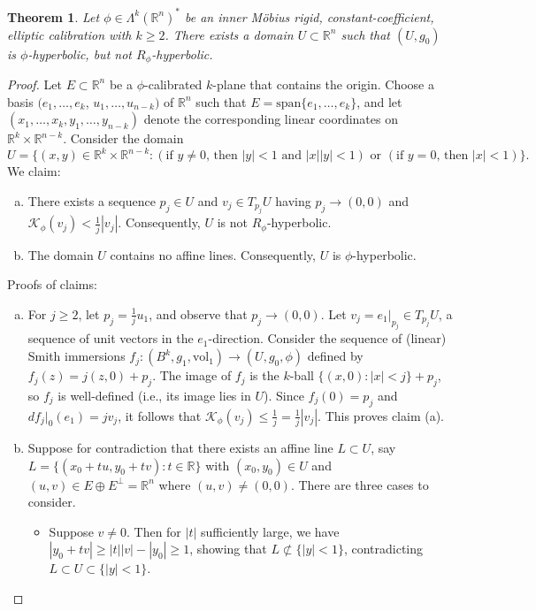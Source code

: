 \documentclass[11pt]{article}
\newcommand{\R}{\mathbb{R}}
\newcommand{\vol}{\mathrm{vol}}
\newtheorem{thm}{Theorem}[section]
\theoremstyle{definition}
\numberwithin{equation}{section}
\begin{document}
\begin{thm} \label{thm:CounterConverse} Let $\phi \in \Lambda^k(\R^n)^*$ be an inner M\"{o}bius rigid, constant-coefficient, elliptic calibration with $k \geq 2$.  There exists a domain $U \subset \R^n$ such that $(U,g_0)$ is $\phi$-hyperbolic, but not $R_\phi$-hyperbolic.
\end{thm}

\begin{proof}  Let $E \subset \R^n$ be a $\phi$-calibrated $k$-plane that contains the origin.  Choose a basis $(e_1, \ldots, e_k$, $u_1, \ldots, u_{n-k})$ of $\R^n$ such that $E = \mathrm{span}\{e_1, \ldots, e_k\}$, and let $(x_1, \ldots, x_k, y_1, \ldots, y_{n-k})$ denote the corresponding linear coordinates on $\R^k \times \R^{n-k}$.  Consider the domain
$$U = \{ (x,y) \in \R^k \times \R^{n-k} \colon (\text{if }y \neq 0, \,\text{then } |y| < 1 \text{ and } |x| |y| < 1) \text{ or } (\text{if }y = 0, \,\text{then } |x| < 1) \}.$$
We claim:
\begin{enumerate}[(a)]
\item There exists a sequence $p_j \in U$ and $v_j \in T_{p_j}U$ having $p_j \to (0,0)$ and $\mathcal{K}_\phi(v_j) < \frac{1}{j}|v_j|$.  Consequently, $U$ is not $R_\phi$-hyperbolic.
\item The domain $U$ contains no affine lines.  Consequently, $U$ is $\phi$-hyperbolic.
\end{enumerate}
Proofs of claims:
\begin{enumerate}[(a)]
\item For $j \geq 2$, let $p_j = \frac{1}{j}u_1$, and observe that $p_j \to (0,0)$.  Let $v_j = e_1|_{p_j} \in T_{p_j}U$, a sequence of unit vectors in the $e_1$-direction.  Consider the sequence of (linear) Smith immersions $f_j \colon (B^k, g_1, \vol_1) \to (U, g_0, \phi)$ defined by $f_j(z) = j(z,0) + p_j$.  The image of $f_j$ is the $k$-ball $\{(x,0) \colon |x| < j\} + p_j$, so $f_j$ is well-defined (i.e., its image lies in $U$).  Since $f_j(0) = p_j$ and $df_j|_0(e_1) = jv_j$, it follows that $\mathcal{K}_\phi(v_j) \leq \frac{1}{j} = \frac{1}{j}|v_j|$.  This proves claim (a).
\item Suppose for contradiction that there exists an affine line $L \subset U$, say $L =  \{(x_0 + tu, y_0 + tv) \colon t \in \R\}$
with $(x_0, y_0) \in U$ and $(u,v) \in E \oplus E^\perp = \R^n$ where $(u,v) \neq (0,0)$.  There are three cases to consider.
\begin{itemize}
\item Suppose $v \neq 0$.  Then for $|t|$ sufficiently large, we have $|y_0 + tv| \geq |t| |v| - |y_0| \geq 1$, showing that $L \not\subset \{ |y| < 1\}$, contradicting $L \subset U \subset \{|y| < 1\}$.

\end{itemize}
\end{enumerate}
\end{proof}
\end{document}
